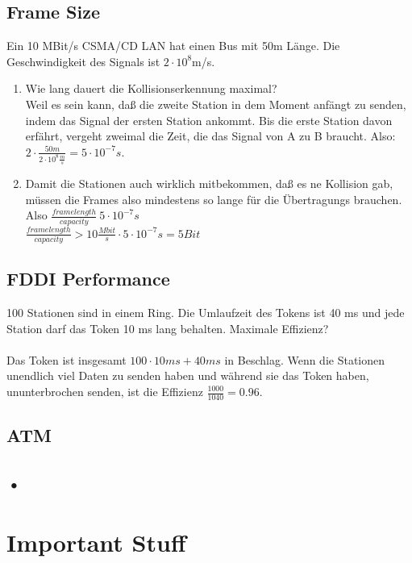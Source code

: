 \documentclass[10pt,a4paper]{scrartcl}
\begin{document}
\subsection*{Frame Size}
Ein 10 MBit/s CSMA/CD LAN hat einen Bus mit 50m Länge. Die Geschwindigkeit des Signals ist $2\cdot 10^8$m/s.
\begin{enumerate}
\item Wie lang dauert die Kollisionserkennung maximal?\\
Weil es sein kann, daß die zweite Station in dem Moment anfängt zu senden, indem das Signal der ersten Station ankommt. Bis die erste Station davon erfährt, vergeht zweimal die Zeit, die das Signal von A zu B braucht. Also: $2\cdot \frac{50m}{2\cdot 10^8\frac{m}{s}} = 5\cdot 10^{-7}s$.
\item Damit die Stationen auch wirklich mitbekommen, daß es ne Kollision gab, müssen die Frames also mindestens so lange für die Übertragungs brauchen. \\
Also $ \frac{framelength}{capacity}\>5 \cdot 10^{-7}s $\\
$ \frac{framelength}{capacity} > 10 \frac{Mbit}{s}\cdot 5 \cdot 10^{-7}s = 5 Bit $ 
\end{enumerate}

\subsection*{FDDI Performance}
100 Stationen sind in einem Ring. Die Umlaufzeit des Tokens ist 40 ms und jede Station darf das Token 10 ms lang behalten. Maximale Effizienz?\\
\\
Das Token ist insgesamt $100\cdot 10ms+40ms$ in Beschlag. Wenn die Stationen unendlich viel Daten zu senden haben und während sie das Token haben, ununterbrochen senden, ist die Effizienz $ \frac{1000}{1040} = 0.96$.

\subsection*{ATM}

\subsection*{•}


\section*{Important Stuff}
\end{document}
